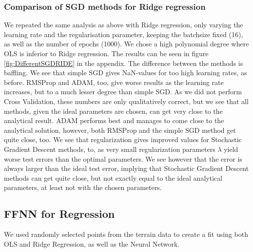 \documentclass[11pt,a4paper,titlepage]{article}
\begin{document}
\subsubsection{Comparison of SGD methods for Ridge regression}
We repeated the same analysis as above with Ridge regression, only varying the learning rate and the regularisation parameter, keeping the batchsize fixed (16), as well as the number of epochs (1000). We chose a high polynomial degree where OLS is inferior to Ridge regression. The results can be seen in figure \ref{fig:DifferentSGDRIDE} in the appendix. The difference between the methods is baffling. We see that simple SGD gives NaN-values for too high learning rates, as before. RMSProp and ADAM, too, give worse results as the learning rate increases, but to a much lesser degree than simple SGD. As we did not perform Cross Validation, these numbers are only qualitatively correct, but we see that all methods, given the ideal parameters are chosen, can get very close to the analytical result. ADAM performs best and manages to come close to the analytical solution, however, both RMSProp and the simple SGD method get quite close, too. We see that regularization gives improved values for Stochastic Gradient Descent methods, to, as very small regularization parameters $\lambda$ yield worse test errors than the optimal parameters. We see however that the error is always larger than the ideal test error, implying that Stochastic Gradient Descent methods can get quite close, but not exactly equal to the ideal analytical parameters, at least not with the chosen parameters. 
\subsection{FFNN for Regression}
We used randomly selected points from the terrain data \citep{Project1} to create a fit using both OLS and Ridge Regression, as well as the Neural Network.
\end{document}

